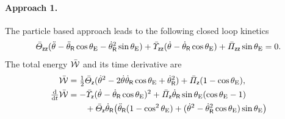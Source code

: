 \paragraph{Approach 1.}
The particle based approach leads to the following closed loop kinetics
\begin{align}
 \label{eq:RevoluteJointClosedLoopApproachParticles}
 \bar{\varTheta}_{\mathsf{z}\mathsf{z}} (\ddot{\theta}_{} - \ddot{\theta}_{\mathsf{R}} \cos\theta_{\mathrm{E}} - \dot{\theta}_{\mathsf{R}}^2 \sin\theta_{\mathrm{E}} ) + \bar{\varUpsilon}_{\mathsf{z}\mathsf{z}} (\dot{\theta}_{} - \dot{\theta}_{\mathsf{R}} \cos\theta_{\mathrm{E}}) + \bar{\varPi}_{\mathsf{z}\mathsf{z}} \sin \theta_{\mathrm{E}} = 0.
\end{align}
The total energy $\bar{\mathcal{W}}$ and its time derivative are
\begin{subequations}
\begin{align}
 \bar{\mathcal{W}} &= \tfrac{1}{2} \bar{\varTheta}_{\mathsf{z}} (\dot{\theta}_{}^2 - 2\dot{\theta}_{} \dot{\theta}_{\mathsf{R}} \cos\theta_{\mathrm{E}} + \dot{\theta}_{\mathsf{R}}^2 ) + \bar{\varPi}_{\mathsf{z}} (1 - \cos\theta_{\mathrm{E}}),
\\
 \tfrac{\mathrm{d} }{\mathrm{d} t} \bar{\mathcal{W}} 
 &= -\bar{\varUpsilon}_{\mathsf{z}} (\dot{\theta}_{} - \dot{\theta}_{\mathsf{R}} \cos\theta_{\mathrm{E}})^2 + \bar{\varPi}_{\mathsf{z}} \dot{\theta}_{\mathsf{R}} \sin \theta_{\mathrm{E}} (\cos\theta_{\mathrm{E}} - 1)
\nonumber\\
 &\qquad + \bar{\varTheta}_{\mathsf{z}} \dot{\theta}_{\mathsf{R}} \big( \ddot{\theta}_{\mathsf{R}} (1-\cos^2 \theta_{\mathrm{E}}) + (\dot{\theta}_{}^2  - \dot{\theta}_{\mathsf{R}}^2 \cos\theta_{\mathrm{E}}) \sin\theta_{\mathrm{E}} \big)
\end{align} 
\end{subequations}
